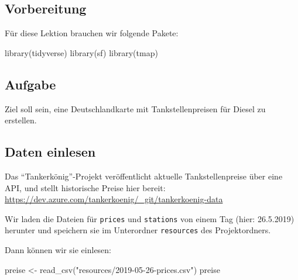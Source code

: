 \documentclass[11pt,german,a4paper]{article}
\newenvironment{Shaded}{\begin{snugshade}}{\end{snugshade}}
\newcommand{\FunctionTok}[1]{\textcolor[rgb]{0.00,0.00,0.00}{#1}}
\newcommand{\NormalTok}[1]{#1}
\newcommand{\OtherTok}[1]{\textcolor[rgb]{0.56,0.35,0.01}{#1}}
\newcommand{\StringTok}[1]{\textcolor[rgb]{0.31,0.60,0.02}{#1}}
\begin{document}
\hypertarget{vorbereitung-2}{%
\subsection{Vorbereitung}\label{vorbereitung-2}}

Für diese Lektion brauchen wir folgende Pakete:

\begin{Shaded}
\begin{Highlighting}[]
\FunctionTok{library}\NormalTok{(tidyverse)}
\FunctionTok{library}\NormalTok{(sf)}
\FunctionTok{library}\NormalTok{(tmap)}
\end{Highlighting}
\end{Shaded}

\hypertarget{aufgabe}{%
\subsection{Aufgabe}\label{aufgabe}}

Ziel soll sein, eine Deutschlandkarte mit Tankstellenpreisen für Diesel zu erstellen.

\hypertarget{daten-einlesen}{%
\subsection{Daten einlesen}\label{daten-einlesen}}

Das ``Tankerkönig''-Projekt veröffentlicht aktuelle Tankstellenpreise über eine API, und stellt historische Preise hier bereit: \url{https://dev.azure.com/tankerkoenig/_git/tankerkoenig-data}

Wir laden die Dateien für \texttt{prices} und \texttt{stations} von einem Tag (hier: 26.5.2019) herunter und speichern sie im Unterordner \texttt{resources} des Projektordners.

Dann können wir sie einlesen:

\begin{Shaded}
\begin{Highlighting}[]
\NormalTok{preise }\OtherTok{\textless{}{-}} \FunctionTok{read\_csv}\NormalTok{(}\StringTok{"resources/2019{-}05{-}26{-}prices.csv"}\NormalTok{)}
\NormalTok{preise}
\end{Highlighting}
\end{Shaded}
\end{document}
